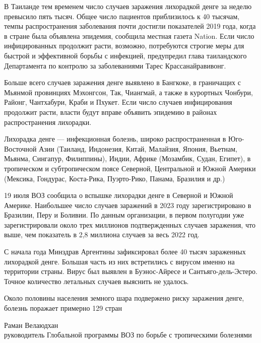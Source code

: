 В Таиланде тем временем число случаев заражения лихорадкой денге за неделю превысило пять тысяч. Общее число пациентов приблизилось к 40 тысячам, темпы распространения заболевания почти достигли показателей 2019 года, когда в стране была объявлена эпидемия, сообщила местная газета Nation. Если число инфицированных продолжит расти, возможно, потребуются строгие меры для быстрой и эффективной борьбы с инфекцией, предупредил глава таиландского Департамента по контролю за заболеваниями Тарес Крассанайравивонг.

Больше всего случаев заражения денге выявлено в Бангкоке, в граничащих с Мьянмой провинциях Мэхонгсон, Так, Чиангмай, а также в курортных Чонбури, Районг, Чантхабури, Краби и Пхукет. Если число случаев инфицирования продолжит расти, власти будут вправе объявить эпидемию в районах распространения лихорадки.

\begin{fancyquotes}
    Лихорадка денге — инфекционная болезнь, широко распространенная в Юго-Восточной Азии (Таиланд, Индонезия, Китай, Малайзия, Япония, Вьетнам, Мьянма, Сингапур, Филиппины), Индии, Африке (Мозамбик, Судан, Египет), в тропическом и субтропическом поясе Северной, Центральной и Южной Америки (Мексика, Гондурас, Коста-Рика, Пуэрто-Рико, Панама, Бразилия и др.)
\end{fancyquotes}

19 июля ВОЗ сообщила о вспышке лихорадки денге в Северной и Южной Америке. Наибольшее число случаев заражений в 2023 году зарегистрировано в Бразилии, Перу и Боливии. По данным организации, в первом полугодии уже зарегистрировали около трех миллионов подтвержденных случаев заражения, что выше, чем показатель в 2,8 миллиона случаев за весь 2022 год.

С начала года Минздрав Аргентины зафиксировал более 40 тысяч зараженных лихорадкой денге. Большая часть из них встретились с вирусом именно на территории страны. Вирус был выявлен в Буэнос-Айресе и Сантьяго-дель-Эстеро. Точное количество летальных случаев выяснить не удалось.

\begin{fancyquotes}
    Около половины населения земного шара подвержено риску заражения денге, болезнь поражает примерно 129 стран

    \begin{flushright}
        Раман Велаюдхан\\
        руководитель Глобальной программы ВОЗ по борьбе с тропическими болезнями
    \end{flushright}
\end{fancyquotes}

